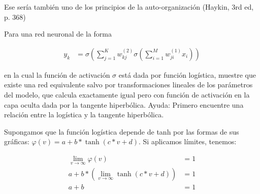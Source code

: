 \documentclass[11pt,spanish,answers]{exam}
\begin{document}
\begin{questions}
\begin{solution}
\begin{center}

        \end{center}
        
        Ese sería también uno de los principios de la auto-organización (Haykin, 3rd ed, p. 368)
        
    \end{solution}


\question
Para una red neuronal de la forma

\begin{equation} \label{eq4}
    \begin{split}
        y_k & = \sigma(\sum_{j=1}^{K} w_{kj}^{(2)} \sigma(\sum_{i=1}^{M} w_{ji}^{(1)} x_i))
    \end{split}
\end{equation}

en la cual la función de activación $\sigma$ está dada por función logística, muestre que
existe una red equivalente salvo por transformaciones lineales de los parámetros del
modelo, que calcula exactamente igual pero con función de activación  en la capa oculta
dada por la tangente hiperbólica. Ayuda: Primero encuentre una relación entre la
logística y la tangente hiperbólica.


\begin{solution}

    Supongamos que la función logística depende de tanh por las formas de sus gráficas: $\varphi(v) = a + b*\tanh(c*v + d)$. Si aplicamos límites, tenemos:
    
    \begin{align*}
        \lim_{v \to \infty} \varphi(v) &= 1 \tag*{(Límite de la logística al tender al infinito)}\\
        a + b*(\lim_{v \to \infty} \tanh(c*v+d)) &= 1 \tag*{(Sustituyendo la suposición y aplicando límite)}\\
        a + b &= 1 \tag*{(Límite de tanh al tener al infinito)}
    \end{align*}
    

\end{solution}
\end{questions}
\end{document}

